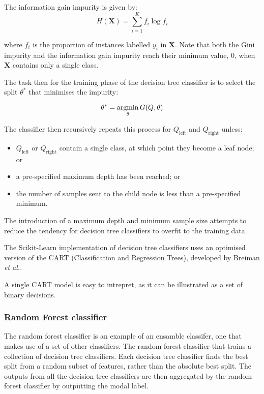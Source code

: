         The information gain impurity is given by:
        $$H(\mathbf{X}) = \sum \limits_{i=1}^K f_i \log f_i$$
      
        where $f_i$ is the proportion of instances labelled $y_i$ in $\mathbf{X}$. Note that both the Gini impurity and the information gain impurity reach their minimum value, $0$, when $\mathbf{X}$ contains only a single class.
      
        The task then for the training phase of the decision tree classifier is to select the split $\theta^*$ that minimises the impurity:
      
        $$\theta^* = \operatorname*{argmin}_\theta G(Q, \theta)$$
      
        The classifier then recursively repeats this process for $Q_\mathrm{left}$ and $Q_\mathrm{right}$ unless:
        \begin{itemize}
          \item $Q_\mathrm{left}$ or $Q_\mathrm{right}$ contain a single class, at which point they become a leaf node; or
          \item a pre-specified maximum depth has been reached; or
          \item the number of samples sent to the child node is less than a pre-specified minimum.
        \end{itemize}
      
        The introduction of a maximum depth and minimum sample size attempts to reduce the tendency for decision tree classifiers to overfit to the training data.
      
        The Scikit-Learn implementation of decision tree classifiers uses an optimised version of the CART (Classification and Regression Trees), developed by Breiman \emph{et al.}\cite{breiman1984classification}.
        
        A single CART model is easy to intrepret, as it can be illustrated as a set of binary decisions.
        
      
      \subsubsection{Random Forest classifier}
        The random forest classifier is an example of an ensamble classifer, one that makes use of a set of other classifiers. The random forest classifier that trains a collection of decision tree classifiers. Each decision tree classifier finds the best split from a random subset of features, rather than the absolute best split. The outputs from all the decision tree classifiers are then aggregated by the random forest classifier by outputting the modal label.
        
